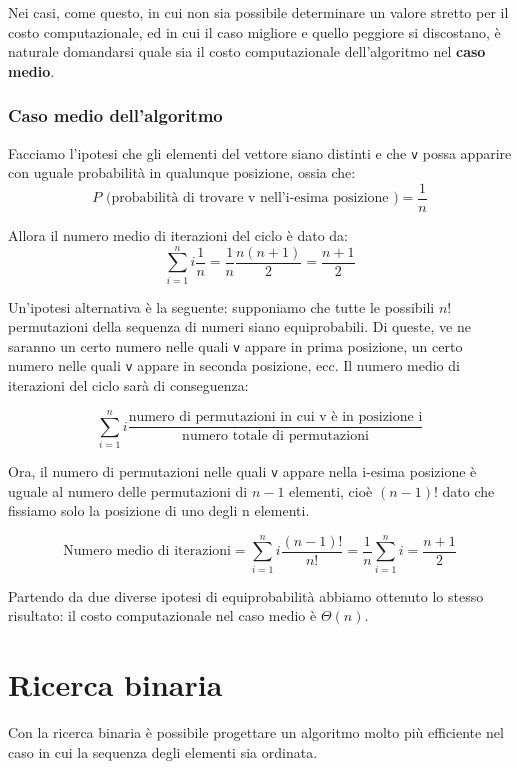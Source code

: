 Nei casi, come questo, in cui non sia possibile determinare un valore stretto per il costo computazionale, ed in cui il caso migliore e quello  peggiore si discostano, è naturale domandarsi quale sia il costo computazionale dell'algoritmo nel \textbf{caso medio}.

\subsubsection{Caso medio dell'algoritmo}

Facciamo l’ipotesi che gli elementi del vettore siano distinti e che \verb|v| possa apparire con uguale probabilità in qualunque posizione, ossia che:
\begin{equation*}
    P\text{ (probabilità di trovare v nell'i-esima posizione )} = \frac{1}{n}
\end{equation*}

Allora il numero medio di iterazioni del ciclo è dato da:
\begin{equation*}
    \sum^n_{i=1}i\frac{1}{n}=\frac{1}{n}\frac{n(n+1)}{2}=\frac{n+1}{2}
\end{equation*}


Un’ipotesi alternativa è la seguente: supponiamo che tutte le possibili $n!$ permutazioni della sequenza di numeri siano equiprobabili.
Di queste, ve ne saranno un certo numero nelle quali \verb|v| appare in prima posizione, un certo numero nelle quali \verb|v| appare in seconda posizione, ecc.
Il numero medio di iterazioni del ciclo sarà di conseguenza: 

\begin{equation*}
    \sum^n_{i=1}i\frac{\text{numero di permutazioni in cui v è in posizione i}}{\text{numero totale di permutazioni}}
\end{equation*}

Ora, il numero di permutazioni nelle quali \verb|v| appare nella i-esima posizione è uguale al numero delle permutazioni di $n-1$ elementi, cioè $(n-1)!$ dato che fissiamo solo la posizione di uno degli n elementi.

\begin{equation*}
    \text{Numero medio di iterazioni}=\sum^n_{i=1}i\frac{(n-1)!}{n!}=\frac{1}{n}\sum^n_{i=1}i=\frac{n+1}{2}
\end{equation*}

Partendo da due diverse ipotesi di equiprobabilità abbiamo ottenuto lo stesso
risultato: il costo computazionale nel caso medio è $\Theta(n)$.


\section{Ricerca binaria}
Con la ricerca binaria è possibile progettare un algoritmo molto più efficiente nel caso in cui la sequenza degli elementi sia ordinata.

